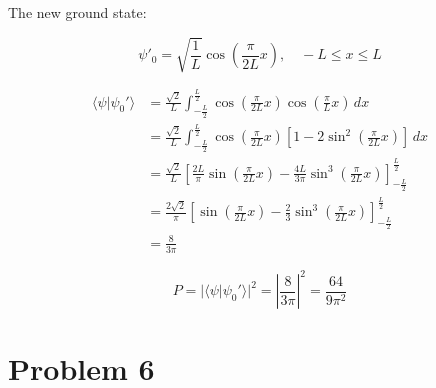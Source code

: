 \documentclass[12pt]{article}
\begin{document}
The new ground state:

\[
    \psi'_0 = \sqrt{\frac{1}{L}}\cos{(\frac{\pi}{2L}x)}, \quad -L \leq x \leq L
\]

\begin{equation*}
    \begin{split}
        \langle \psi | \psi_0' \rangle
         & = \frac{\sqrt{2}}{L} \int_{-\frac{L}{2}}^{\frac{L}{2}} \cos{(\frac{\pi}{2L}x)}\cos{(\frac{\pi}{L}x)}\,dx                                        \\
         & = \frac{\sqrt{2}}{L} \int_{-\frac{L}{2}}^{\frac{L}{2}} \cos{(\frac{\pi}{2L}x)}[1-2\sin^2{(\frac{\pi}{2L}x)}]\,dx                                \\
         & = \frac{\sqrt{2}}{L} \left[\frac{2L}{\pi}\sin{(\frac{\pi}{2L}x)} - \frac{4L}{3\pi}\sin^3{(\frac{\pi}{2L}x)}\right]_{-\frac{L}{2}}^{\frac{L}{2}} \\
         & = \frac{2\sqrt{2}}{\pi} \left[\sin{(\frac{\pi}{2L}x)} - \frac{2}{3}\sin^3{(\frac{\pi}{2L}x)}\right]_{-\frac{L}{2}}^{\frac{L}{2}}                \\
         & =  \frac{8}{3 \pi}
    \end{split}
\end{equation*}

\[
    P = |\langle \psi | \psi_0' \rangle|^2 = {|\frac{8}{3 \pi}|}^2 = \frac{64}{9\pi^2}
\]


\newpage
\section{Problem 6}



\newpage



\nocite{El-Deeb_PEU-323_Assignments}
\end{document}
